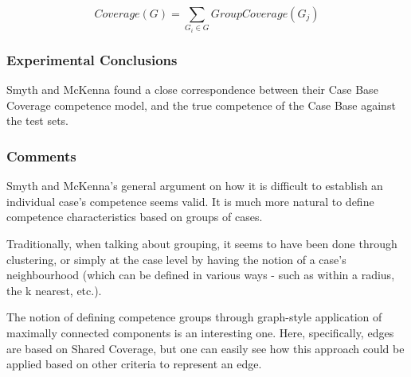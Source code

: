 \documentclass[a4paper,11pt]{report}
\begin{document}
\[
Coverage(G)=\underset{G_{i}\in G}{\sum}GroupCoverage(G_{j})
\]

\subsubsection{Experimental Conclusions}
Smyth and McKenna found a close correspondence between their Case Base Coverage competence model, and the true competence of the Case Base against the test sets\cite{Smyth1998}.

\subsubsection{Comments}
Smyth and McKenna's general argument on how it is difficult to establish an individual case's competence seems valid. It is much more natural to define competence characteristics based on groups of cases. 

Traditionally, when talking about grouping, it seems to have been done through clustering, or simply at the case level by having the notion of a case's neighbourhood (which can be defined in various ways - such as within a radius, the k nearest, etc.).

The notion of defining competence groups through graph-style application of maximally connected components is an interesting one. Here, specifically, edges are based on Shared Coverage, but one can easily see how this approach could be applied based on other criteria to represent an edge.



\end{document}
